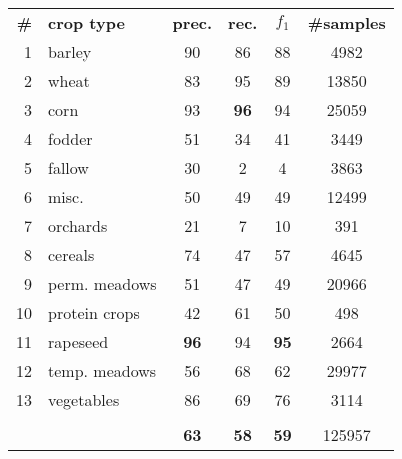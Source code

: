 \begin{tabular}{rlcccc}
\toprule
\textbf{\#} & \textbf{crop type} &  \textbf{prec.} & \textbf{rec.} & \textbf{$f_1$} & \textbf{\#samples} \\
\cmidrule(lr){1-1}\cmidrule(lr){2-2}\cmidrule(lr){3-3}\cmidrule(lr){4-4}\cmidrule(lr){5-5}\cmidrule(lr){6-6}
1 & barley &         90 &          86 &          88 &     4982 \\
2 & wheat &         83 &          95 &          89 &    13850 \\
3 & corn &         93 &          \textbf{96} &          94 &    25059 \\
4 & fodder &         51 &          34 &          41 &     3449 \\
5 & fallow &         30 &           2 &           4 &     3863 \\
6 & misc. &         50 &          49 &          49 &    12499 \\
7 & orchards &         21 &           7 &          10 &      391 \\
8 & cereals &         74 &          47 &          57 &     4645 \\
9 & perm. meadows &         51 &          47 &          49 &    20966 \\
10 & protein crops &         42 &          61 &          50 &      498 \\
11 & rapeseed &         \textbf{96} &          94 &          \textbf{95} &     2664 \\
12 & temp. meadows &         56 &          68 &          62 &    29977 \\
13 & vegetables &         86 &          69 &          76 &     3114 \\
   &                       &            &             &             &          \\
   &                       &         \textbf{63} &          \textbf{58} &          \textbf{59} &   125957 \\
\bottomrule
\end{tabular}

